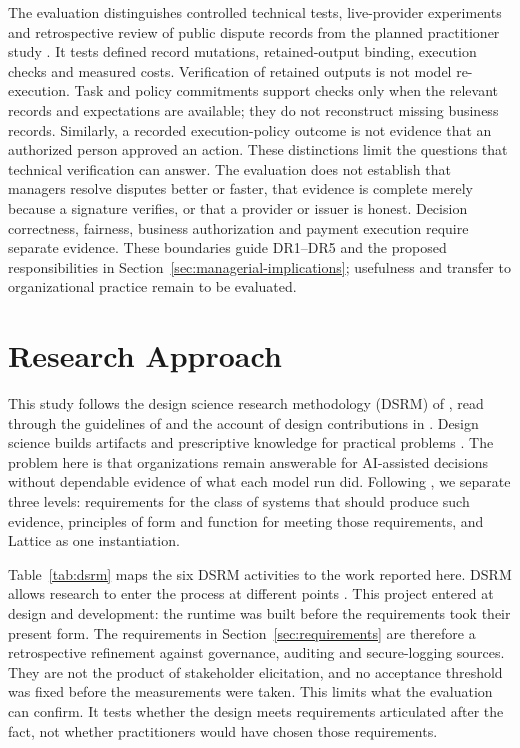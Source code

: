 \documentclass[11pt]{article}
\begin{document}
The evaluation distinguishes controlled technical tests, live-provider experiments and retrospective review of public dispute records from the planned practitioner study \citep{venable2016}. It tests defined record mutations, retained-output binding, execution checks and measured costs. Verification of retained outputs is not model re-execution. Task and policy commitments support checks only when the relevant records and expectations are available; they do not reconstruct missing business records. Similarly, a recorded execution-policy outcome is not evidence that an authorized person approved an action. These distinctions limit the questions that technical verification can answer. The evaluation does not establish that managers resolve disputes better or faster, that evidence is complete merely because a signature verifies, or that a provider or issuer is honest. Decision correctness, fairness, business authorization and payment execution require separate evidence. These boundaries guide DR1--DR5 and the proposed responsibilities in Section~\ref{sec:managerial-implications}; usefulness and transfer to organizational practice remain to be evaluated.


\FloatBarrier

\section{Research Approach}\label{sec:method}

This study follows the design science research methodology (DSRM) of \citet{peffers2007}, read through the guidelines of \citet{hevner2004} and the account of design contributions in \citet{gregor2013}. Design science builds artifacts and prescriptive knowledge for practical problems \citep{walls1992,vombrocke2020}. The problem here is that organizations remain answerable for AI-assisted decisions without dependable evidence of what each model run did. Following \citet{gregor2007}, we separate three levels: requirements for the class of systems that should produce such evidence, principles of form and function for meeting those requirements, and Lattice as one instantiation.

Table~\ref{tab:dsrm} maps the six DSRM activities to the work reported here. DSRM allows research to enter the process at different points \citep{peffers2007}. This project entered at design and development: the runtime was built before the requirements took their present form. The requirements in Section~\ref{sec:requirements} are therefore a retrospective refinement against governance, auditing and secure-logging sources. They are not the product of stakeholder elicitation, and no acceptance threshold was fixed before the measurements were taken. This limits what the evaluation can confirm. It tests whether the design meets requirements articulated after the fact, not whether practitioners would have chosen those requirements.
\end{document}
